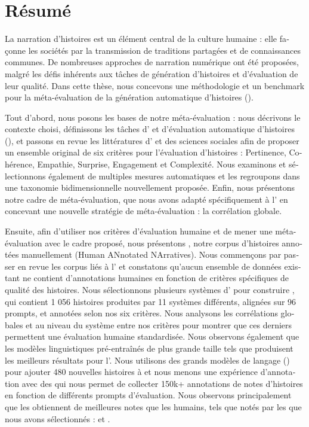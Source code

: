\chapter*{\texorpdfstring{\foreignlanguage{french}{Résumé}}{Résumé}}

\begin{otherlanguage}{french}

La narration d'histoires est un élément central de la culture humaine : elle façonne les sociétés par la transmission de traditions partagées et de connaissances communes. De nombreuses approches de narration numérique ont été proposées, malgré les défis inhérents aux tâches de génération d'histoires et d'évaluation de leur qualité. Dans cette thèse, nous concevons une méthodologie et un benchmark pour la méta-évaluation de la génération automatique d'histoires (\asg).

Tout d'abord, nous posons les bases de notre méta-évaluation : nous décrivons le contexte choisi, définissons les tâches d'{\asg} et d'évaluation automatique d'histoires ({\ase}), et passons en revue les littératures d'{\asg} et des sciences sociales afin de proposer un ensemble original de six critères pour l'évaluation d'histoires : Pertinence, Cohérence, Empathie, Surprise, Engagement et Complexité. Nous examinons et sélectionnons également de multiples mesures automatiques et les regroupons dans une taxonomie bidimensionnelle nouvellement proposée. Enfin, nous présentons notre cadre de méta-évaluation, que nous avons adapté spécifiquement à l'{\asg} en concevant une nouvelle stratégie de méta-évaluation : la corrélation globale.

Ensuite, afin d'utiliser nos critères d'évaluation humaine et de mener une méta-évaluation avec le cadre proposé, nous présentons {\hanna}, notre corpus d'histoires annotées manuellement (Human ANnotated NArratives). Nous commençons par passer en revue les corpus liés à l'{\asg} et constatons qu'aucun ensemble de données existant ne contient d'annotations humaines en fonction de critères spécifiques de qualité des histoires. Nous sélectionnons plusieurs systèmes d'{\asg} pour construire {\hanna}, qui contient 1 056 histoires produites par 11 systèmes différents, alignées sur 96 prompts, et annotées selon nos six critères. Nous analysons les corrélations globales et au niveau du système entre nos critères pour montrer que ces derniers permettent une évaluation humaine standardisée. Nous observons également que les modèles linguistiques pré-entraînés de plus grande taille tels que {\gptt} produisent les meilleurs résultats pour l'{\asg}. Nous utilisons des grands modèles de langage ({\llm}) pour ajouter 480 nouvelles histoires à {\hanna} et nous menons une expérience d'annotation avec des {\llm} qui nous permet de collecter 150k+ annotations de notes d'histoires en fonction de différents prompts d'évaluation. Nous observons principalement que les {\llm} obtiennent de meilleures notes que les humains, tels que notés par les {\llm} que nous avons sélectionnés : {\beluga} et {\mistral}.


\end{otherlanguage}

